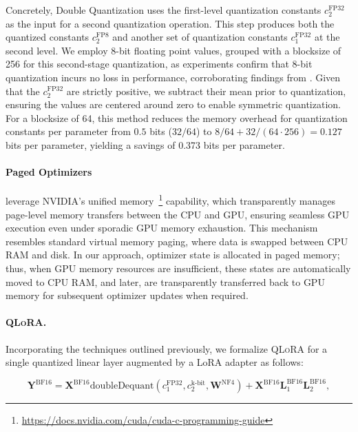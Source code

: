 Concretely, Double Quantization uses the first-level quantization constants $c_2^{\text{FP32}}$ as the input for a second quantization operation. This step produces both the quantized constants $c_2^{\text{FP8}}$ and another set of quantization constants $c_1^{\text{FP32}}$ at the second level. We employ 8-bit floating point values, grouped with a blocksize of 256 for this second-stage quantization, as experiments confirm that 8-bit quantization incurs no loss in performance, corroborating findings from \citet{dettmers2022case}. 
Given that the $c_2^{\text{FP32}}$ are strictly positive, we subtract their mean prior to quantization, ensuring the values are centered around zero to enable symmetric quantization. For a blocksize of 64, this method reduces the memory overhead for quantization constants per parameter from $0.5$ bits ($32/64$) to $8/64 + 32/(64\cdot256) = 0.127$ bits per parameter, yielding a savings of 0.373 bits per parameter.

\paragraph{Paged Optimizers} leverage NVIDIA’s unified memory~\footnote{\tiny \url{https://docs.nvidia.com/cuda/cuda-c-programming-guide}} capability, which transparently manages page-level memory transfers between the CPU and GPU, ensuring seamless GPU execution even under sporadic GPU memory exhaustion. This mechanism resembles standard virtual memory paging, where data is swapped between CPU RAM and disk. In our approach, optimizer state is allocated in paged memory; thus, when GPU memory resources are insufficient, these states are automatically moved to CPU RAM, and later, are transparently transferred back to GPU memory for subsequent optimizer updates when required.

\paragraph{\textsc{QLoRA}.} Incorporating the techniques outlined previously, we formalize \textsc{QLoRA} for a single quantized linear layer augmented by a LoRA adapter as follows:

\begin{equation}
    \mathbf{Y}^{\text{BF16}} =  \mathbf{X}^{\text{BF16}} \text{doubleDequant}(c_1^{\text{FP32}}, c_2^{\text{k-bit}}, \mathbf{W}^{\text{NF4}}) + \mathbf{X}^{\text{BF16}}\mathbf{L}^{\text{BF16}}_1\mathbf{L}^{\text{BF16}}_2,
\end{equation}

